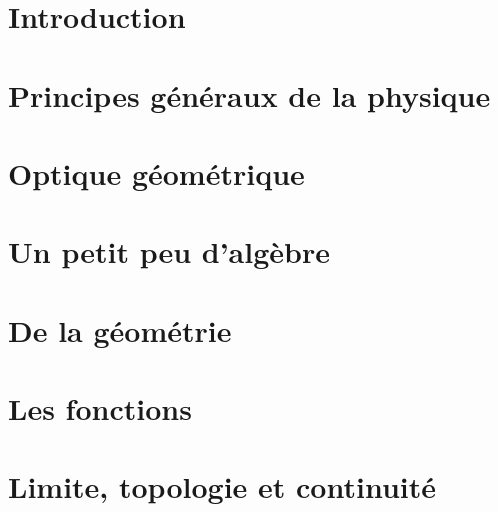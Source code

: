 




\makeindex



%



\tableofcontents

\chapter{Introduction}
	

\chapter{Principes généraux de la physique}
	
	

\chapter{Optique géométrique}
	
	
	
	
	

\chapter{Un petit peu d'algèbre}
	
	 

\chapter{De la géométrie}
	

\chapter{Les fonctions}
	

\chapter{Limite, topologie et continuité}	
	

